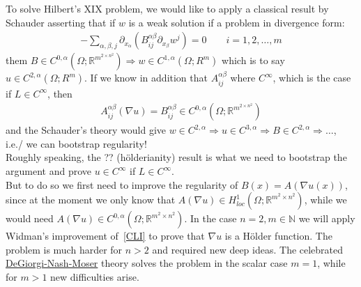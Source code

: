 To solve Hilbert's XIX problem, we would like to apply a classical result by Schauder asserting that if \( w \) is a weak solution if a problem in divergence form:
\begin{gather}
	- \sum\limits_{\alpha ,\beta ,j}^{} \partial_{x_{\alpha }} \left( B_{ij}^{\alpha \beta } \partial_{x_{\beta }} w^{j} \right) = 0\qquad i = 1,2,\ldots,m
\end{gather}
them \( B \in  C^{0, \alpha }(\Omega ; \mathbb{R}^{m^{2 \times n^{2}}}) \Rightarrow w \in C^{1, \alpha }(\Omega ; R^{m}) \) which is to say \( u \in C^{2, \alpha }(\Omega ; R^{m}) \). If we know in addition that \( A_{ij}^{\alpha \beta } \) where \( C^{\infty } \), which is the case if \( L \in  C^{\infty } \), then
\begin{gather}
	A_{ij}^{\alpha \beta }(\nabla u) = B_{ij}^{\alpha \beta } \in C^{0, \alpha }(\Omega ; \mathbb{R}^{m^{2 \times n^{2}}})
\end{gather}
and the Schauder's theory would give \( w \in C^{2, \alpha } \Rightarrow u \in C^{3, \alpha } \Rightarrow B \in C^{2, \alpha } \Rightarrow \ldots \), i.e./ we can bootstrap regularity! \\
Roughly speaking, the ?? (hölderianity) result is what we need to bootstrap the argument and prove \( u \in  C^{\infty } \) if \( L \in C^{\infty } \). \\
But to do so we first need to improve the regularity of \( B(x) = A(\nabla u(x))	\), since at the moment we only know that \( A(\nabla u ) \in H_{loc}^{1}(\Omega ; \mathbb{R}^{m^{2} \times n^{2}}) \), while we would need \( A(\nabla u ) \in C^{0, \alpha }(\Omega ; \mathbb{R}^{m^{2} \times n^{2}})  \). In the case \( n=2, m \in  \mathbb{N} \) we will apply Widman's improvement of~\eqref{CLI} to prove that \( \nabla u \) is a Hölder function. The problem is much harder for \( n >2 \) and required new deep ideas. The celebrated \underline{DeGiorgi-Nash-Moser} theory solves the problem in the scalar case \( m=1 \), while for \( m >1 \) new difficulties arise.